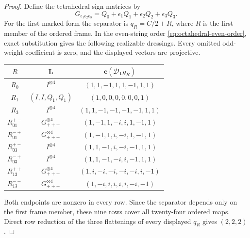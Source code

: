 \documentclass[11pt,letterpaper,onecolumn]{article}
\theoremstyle{plain}
\theoremstyle{definition}
\theoremstyle{remark}
\begin{document}
\begin{proof}
Define the tetrahedral sign matrices by
\[
  G_{\epsilon_1\epsilon_2\epsilon_3}
  =Q_0+\epsilon_1Q_1+\epsilon_2Q_2+\epsilon_3Q_3.
\]
For the first marked form the separator is \(q_R=C/2+R\), where \(R\)
is the first member of the ordered frame.  In the even-string order
\cref{eq:octahedral-even-order}, exact substitution gives the following
realizable dressings. Every omitted odd-weight coefficient is zero, and the
displayed vectors are projective.
\begin{center}
\normalsize
\setlength{\tabcolsep}{4pt}
\begin{tabular}{ccc}
\toprule
\(R\)&\(\mathbf L\)&\(\mathbf e(\mathscr D_{\mathbf L}q_R)\)\\
\midrule
\(R_0\)&\(I^{\otimes4}\)&\((1,1,-1,1,1,-1,1,1)\)\\
\(R_1\)&\((I,I,Q_1,Q_1)\)&\((1,0,0,0,0,0,0,1)\)\\
\(R_3\)&\(I^{\otimes4}\)&\((1,1,-1,-1,-1,-1,1,1)\)\\
\(R_{01}^{+-}\)&\(G_{+++}^{\otimes4}\)&\((1,-1,1,-i,i,1,-1,1)\)\\
\(R_{01}^{-+}\)&\(G_{+++}^{\otimes4}\)&\((1,-1,1,i,-i,1,-1,1)\)\\
\(R_{03}^{+-}\)&\(I^{\otimes4}\)&\((1,1,-1,i,-i,-1,1,1)\)\\
\(R_{03}^{-+}\)&\(I^{\otimes4}\)&\((1,1,-1,-i,i,-1,1,1)\)\\
\(R_{13}^{++}\)&\(G_{++-}^{\otimes4}\)&\((1,i,-i,-i,-i,-i,i,-1)\)\\
\(R_{13}^{--}\)&\(G_{++-}^{\otimes4}\)&\((1,-i,i,i,i,i,-i,-1)\)\\
\bottomrule
\end{tabular}
\end{center}
Both endpoints are nonzero in every row.  Since the separator depends
only on the first frame member, these nine rows cover all twenty-four
ordered maps.  Direct row reduction of the three flattenings of
every displayed \(q_R\) gives \((2,2,2)\).


\end{proof}
\end{document}

